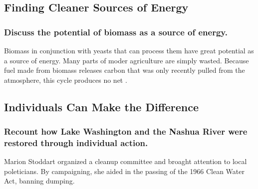 \documentclass[a4paper]{article}
\begin{document}
\subsection{Finding Cleaner Sources of Energy}
\subsubsection{Discuss the potential of biomass as a source of energy.}
Biomass in conjunction with yeasts that can process them have great potential as a source of energy. Many parts of moder agriculture are simply wasted. 
Because fuel made from biomass releases carbon that was only recently pulled from the atmosphere, this cycle produces no net .

\subsection{Individuals Can Make the Difference}
\subsubsection{Recount how Lake Washington and the Nashua River were restored through individual action.}
Marion Stoddart organized a cleanup committee and broaght attention to local poleticians. By campaigning, she aided in the passing of the 1966 Clean Water Act, banning dumping.
\end{document}
